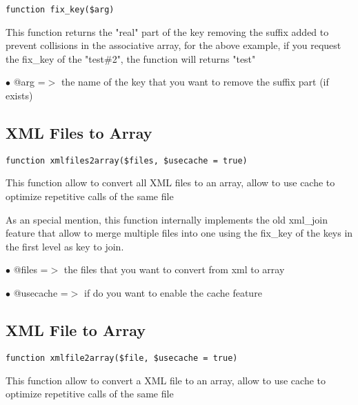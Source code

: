 \documentclass[a4paper]{book}
\begin{document}
\begin{lstlisting}
function fix_key($arg)
\end{lstlisting}

This function returns the "real" part of the key removing the suffix added to
prevent collisions in the associative array, for the above example, if you request
the fix\_key of the "test\#2", the function will returns "test"

\begin{compactitem}
\item[\color{myblue}$\bullet$] @arg =$>$ the name of the key that you want to remove the suffix part (if exists)
\end{compactitem}

\hypertarget{toc321}{}
\subsection{XML Files to Array}

\begin{lstlisting}
function xmlfiles2array($files, $usecache = true)
\end{lstlisting}

This function allow to convert all XML files to an array, allow to use cache to
optimize repetitive calls of the same file

As an special mention, this function internally implements the old xml\_join feature
that allow to merge multiple files into one using the fix\_key of the keys in the first
level as key to join.

\begin{compactitem}
\item[\color{myblue}$\bullet$] @files    =$>$ the files that you want to convert from xml to array
\item[\color{myblue}$\bullet$] @usecache =$>$ if do you want to enable the cache feature
\end{compactitem}

\hypertarget{toc322}{}
\subsection{XML File to Array}

\begin{lstlisting}
function xmlfile2array($file, $usecache = true)
\end{lstlisting}

This function allow to convert a XML file to an array, allow to use cache to
optimize repetitive calls of the same file
\end{document}
